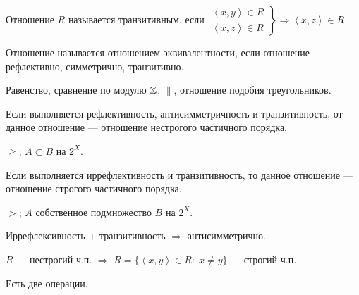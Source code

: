 \begin{definition}
    Отношение $R$ называется транзитивным, если  $\left. \begin{array}{r} \left<x, y\right> \in R \\ \left<x, z\right> \in R\end{array} \right\} \Rightarrow \left<x, z\right> \in R$
\end{definition}
 \begin{definition}
    Отношение называется отношением эквивалентности, если отношение рефлективно, симметрично, транзитивно.
\end{definition}
\begin{example}
    Равенство, сравнение по модулю $\mathbb{Z}$,  $\|$, отношение подобия треугольников.
\end{example}
\begin{definition}
    Если выполняется рефлективность, антисимметричность и транзитивность, от данное отношение --- отношение нестрогого частичного порядка.
\end{definition}
\begin{example}
    $\ge$; $A \subset B$ на $2^X$. 
\end{example}
\begin{definition}
    Если выполняется иррефлективность и транзитивность, то данное отношение --- отношение строгого частичного порядка. 
\end{definition}
 \begin{example}
    $>$;  $A$ собственное подмножество  $B$ на  $2^X$.
\end{example}
\begin{exerc}
    Иррефлексивность + транзитивность $\Rightarrow$ антисимметрично.
\end{exerc}
\begin{exerc}
    $R$ --- нестрогий ч.п.  $\Rightarrow$ $R = \{\left<x,y\right> \in R: \; x \neq y\}$ --- строгий ч.п.
\end{exerc}
Есть две операции.
